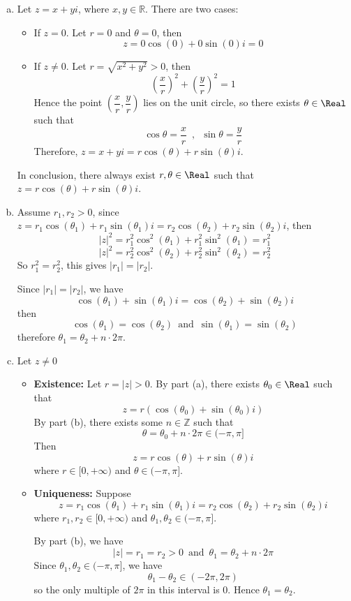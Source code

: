\begin{myproof}
    \begin{enumerate}[(a)]
    \item 
        Let $z=x+yi$, where $x,y \in \mathbb{R}$. There are two cases:
        \begin{itemize}  
            \item If $z=0$. Let $r=0$ and $\theta=0$, then
            \[z = 0\cos(0) + 0\sin(0) i = 0\]
            \item If $z \ne 0$. Let $r = \sqrt{x^2+y^2} > 0$, then
            \[\left(\dfrac{x}{r}\right)^2+\left(\dfrac{y}{r}\right)^2=1\]
            Hence the point $\left(\dfrac{x}{r},\dfrac{y}{r}\right)$ lies on the unit circle, so there exists $\theta \in \Real$ such that
            \[\cos \theta = \dfrac{x}{r} \enspace, \enspace \sin \theta = \dfrac{y}{r} \]
            Therefore, $z = x+yi = r \cos(\theta) + r \sin(\theta) i$.
        \end{itemize}
    In conclusion, there always exist $r,\theta \in \Real$ such that $z = r\cos(\theta) + r\sin(\theta) i$.
    \item Assume $r_1, r_2 >0$, since $z=r_1\cos(\theta_1) + r_1\sin(\theta_1) i = r_2\cos(\theta_2) + r_2\sin(\theta_2) i$, then
    \[|z|^2 = r_1^2\cos^2(\theta_1)+r_1^2\sin^2(\theta_1) = r_1^2\]
    \[|z|^2 = r_2^2\cos^2(\theta_2)+r_2^2\sin^2(\theta_2) = r_2^2\]
    So $r_1^2 = r_2^2$, this gives $|r_1| = |r_2|$.

    Since $|r_1| = |r_2|$, we have
    \[\cos(\theta_1) + \sin(\theta_1) i = \cos(\theta_2) + \sin(\theta_2) i\]
    then
    \[\cos(\theta_1) = \cos(\theta_2) \enspace \text{and} \enspace \sin(\theta_1) = \sin(\theta_2)\]
    therefore $\theta_1 = \theta_2 + n \cdot 2\pi$.
    \item Let $z \ne 0$
        \begin{itemize}
            \item \textbf{Existence: }Let $r=|z|>0$. By part (a), there exists $\theta_0 \in \Real$ such that
            \[z=r(\cos(\theta_0)+\sin(\theta_0) i)\]
            By part (b), there exists some $n \in \mathbb{Z}$ such that
            \[\theta = \theta_0+n \cdot 2\pi \in (-\pi, \pi]\]
            Then
            \[z = r\cos(\theta)+r\sin(\theta) i\]
            where $r \in [0,+\infty)$ and $\theta \in (-\pi, \pi]$.
            \item \textbf{Uniqueness: }Suppose
            \[z = r_1\cos(\theta_1)+r_1\sin(\theta_1) i = r_2\cos(\theta_2)+r_2\sin(\theta_2) i\]
            where $r_1, r_2 \in [0,+\infty)$ and $\theta_1, \theta_2 \in (-\pi, \pi]$. 
            
            By part (b), we have
            \[|z| = r_1 = r_2 > 0 \enspace \text{and} \enspace \theta_1 = \theta_2+n \cdot 2\pi\]
            Since $\theta_1, \theta_2 \in (-\pi, \pi]$, we have \[\theta_1-\theta_2 \in (-2\pi, 2\pi)\]
            so the only multiple of $2\pi$ in this interval is $0$. Hence $\theta_1 = \theta_2$.
        \end{itemize}
    \end{enumerate}
\end{myproof}

